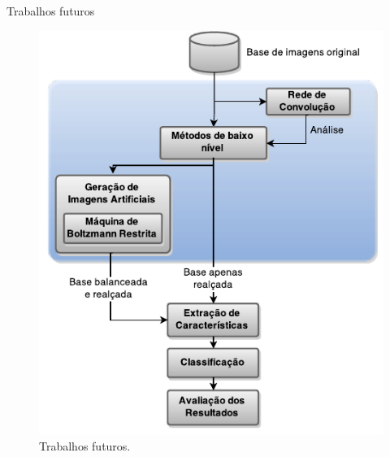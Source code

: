 \documentclass{beamer}
\begin{document}
\begin{frame}{Trabalhos futuros}
\begin{figure}
    \includegraphics[height=0.75\textheight]{figuras/geral.pdf}
    \caption{Trabalhos futuros.}
\end{figure}
\end{frame}
\end{document}
